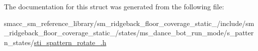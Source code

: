 The documentation for this struct was generated from the following file\+:\begin{DoxyCompactItemize}
\item 
smacc\+\_\+sm\+\_\+reference\+\_\+library/sm\+\_\+ridgeback\+\_\+floor\+\_\+coverage\+\_\+static\+\_/include/sm\+\_\+ridgeback\+\_\+floor\+\_\+coverage\+\_\+static\+\_/states/ms\+\_\+dance\+\_\+bot\+\_\+run\+\_\+mode/s\+\_\+pattern\+\_\+states/\hyperlink{sm__ridgeback__floor__coverage__static__1_2include_2sm__ridgeback__floor__coverage__static__1_2sd4b53af56bc689d5b4b354c9cc1c7f44}{sti\+\_\+spattern\+\_\+rotate\+\_.\+h}\end{DoxyCompactItemize}
